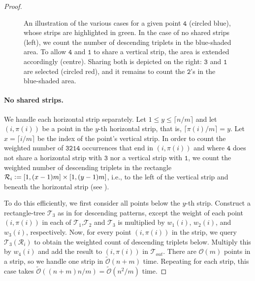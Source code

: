 \documentclass{article}
\newcommand{\eqdef}{\vcentcolon=}
\theoremstyle{remark}
\newcommand{\Otilde}[1]{\widetilde{\mathcal{O}}\left( #1 \right)}
\newcommand{\Oh}[1]{\mathcal{O}\left( #1 \right)}
\theoremstyle{plain}
\begin{document}
\begin{proof}
\begin{figure}[ht]
    
    \vspace{-0.1in}
    \caption{An illustration of the various cases for a given point $\mathtt{4}$ (circled blue), whose strips are highlighted in green. In the case of no shared strips (left), we count the number of descending triplets in the blue-shaded area. To allow $\mathtt{4}$ and $\mathtt{1}$ to share a vertical strip, the area is extended accordingly (centre). Sharing both is depicted on the right:  $\mathtt{3}$ and $\mathtt{1}$ are selected (circled red), and it remains to count the $\mathtt{2}$'s in the blue-shaded area.}
    \label{fig:3214}
\end{figure}

\paragraph{No shared strips.}
We handle each horizontal strip separately.
Let $1\le y \le \lceil n/m\rceil$ and let $(i,\pi(i))$ be a point in the $y$-th horizontal strip, that is, $\lceil \pi(i) / m \rceil = y$. Let $x=\lceil i / m\rceil$ be the index of the point's vertical strip. In order to count the weighted number of $\mathtt{3214}$ occurrences that end in $(i,\pi(i))$
and where $\mathtt{4}$ does not share a horizontal strip with $\mathtt{3}$ nor a vertical strip with $\mathtt{1}$,
we count the weighted number of descending triplets in the rectangle $\mathcal{R}_i\eqdef[1, (x-1) m] \times [1, (y - 1)m]$,
i.e., to the left of the vertical strip and beneath the horizontal strip (see ).

To do this efficiently, we first consider all points below the $y$-th strip. Construct a rectangle-tree $\mathcal{T}_3$ as in  for descending patterns, except the weight of each point $(i,\pi(i))$ in each of $\mathcal{T}_1$,$\mathcal{T}_2$ and $\mathcal{T}_3$ is multiplied by $w_1(i)$, $w_2(i)$, and $w_3(i)$, respectively. Now, for every point $(i,\pi(i))$ in the strip, we query $\mathcal{T}_3(\mathcal{R}_i)$ to obtain the weighted count of descending triplets below.
Multiply this by $w_4(i)$ and add the result to $(i,\pi(i))$ in $\mathcal{T}_{out}$. There are $\Oh{m}$ points in a strip, so we handle one strip in $\Otilde{n+m}$ time. Repeating for each strip, this case takes $\Otilde{(n + m)n/m} = \Otilde{n^2/m}$ time.


\end{proof}
\end{document}
